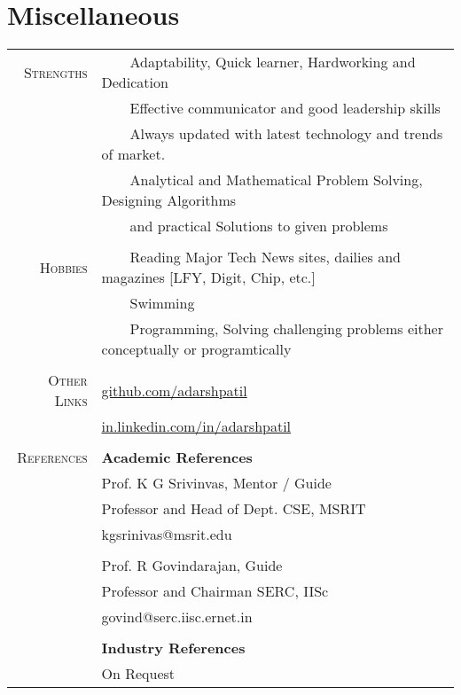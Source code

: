 \documentclass[a4paper,10pt]{article} %
\newcommand{\tabitem}{~~\llap{\textbullet}~~}
\begin{document}
\section{Miscellaneous}
\begin{tabular}{rl}
\textsc{Strengths} & \tabitem Adaptability, Quick learner, Hardworking and Dedication\\
& \tabitem Effective communicator and good leadership skills \\
& \tabitem Always updated with latest technology and trends of market.\\
& \tabitem Analytical and Mathematical Problem Solving, Designing Algorithms \\
& ~~~~and practical Solutions to given problems \\
& \\
\textsc{Hobbies} & \tabitem Reading Major Tech News sites, dailies and magazines [LFY, Digit, Chip, etc.] \\
& \tabitem Swimming \\
& \tabitem Programming, Solving challenging problems either conceptually or programtically \\
& \\
\textsc{Other Links} & \href{https://github.com/adarshpatil}{github.com/adarshpatil} \\
& \href{http://in.linkedin.com/in/adarshpatil}{in.linkedin.com/in/adarshpatil}\\
&\\
\textsc{References} & \textbf{Academic References} \\
& Prof. K G Srivinvas, Mentor / Guide  \\
& Professor and Head of Dept. CSE, MSRIT \\
& kgsrinivas@msrit.edu \\
&\\
& Prof. R Govindarajan, Guide \\
& Professor and Chairman SERC, IISc\\
& govind@serc.iisc.ernet.in \\
&\\
& \textbf{Industry References} \\
& On Request \\
\end{tabular}


\newpage

\end{document}
